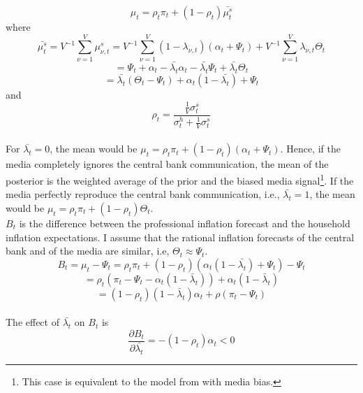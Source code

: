 \documentclass[review]{elsarticle}
\begin{document}
\begin{equation}
\mu_t = \rho_t \pi_t + (1- \rho_t) \bar{\mu_t^s} 
\end{equation}
where
\begin{equation}
\bar{\mu_t^s} = V^{-1} \sum^V_{\nu = 1} \mu_{\nu,t}^s = V^{-1} \sum^V_{\nu =1} (1-\lambda_{\nu,t}) (\alpha_t + \Psi_t) + V^{-1} \sum^V_{\nu =1} \lambda_{\nu,t} \Theta_t  
\end{equation}
\begin{equation}
=\Psi_t + \alpha_t - \bar{\lambda_t} \alpha_t - \bar{\lambda_t} \Psi_t + \bar{\lambda_t}\Theta_t 
\end{equation}
\begin{equation}
=\bar{\lambda_t}(\Theta_t - \Psi_t) + \alpha_t(1- \bar{\lambda_t}) + \Psi_t
\end{equation}
and
\begin{equation}
\rho_t = \frac{\frac{1}{V}\sigma^s_t}{{\sigma^h_t + \frac{1}{V}}\sigma^s_t}
\end{equation}
\\
For $\bar{\lambda_t} = 0$, the mean would be $\mu_t = \rho_t \pi_t + (1- \rho_t) (\alpha_t + \Psi_t)$. Hence, if the media completely ignores the central bank communication, the mean of the posterior is the weighted average of the prior and the biased media signal\footnote{This case is equivalent to the model from \cite{LamlaLein2014} with media bias.}. If the media perfectly reproduce the central bank communication, i.e., $\bar{\lambda_t} = 1$, the mean would be $\mu_t = \rho_t \pi_t + (1-\rho_t) \Theta_t$. 
\\
$B_t$ is the difference between the professional inflation forecast and the household inflation expectations. I assume that the rational inflation forecasts of the central bank and of the media are similar, i.e, $\Theta_t \approx \Psi_t$.
\begin{equation}
B_t = \mu_t - \Psi_t = \rho_t \pi_t + (1-\rho_t)(\alpha_t(1- \bar{\lambda_t}) + \Psi_t) - \Psi_t
\end{equation}
\begin{equation}
= \rho_t (\pi_t - \Psi_t - \alpha_t (1-\bar{\lambda}_t)) + \alpha_t (1- \bar{\lambda}_t)
\end{equation}
\begin{equation}
= (1-\rho_t)(1-\bar{\lambda}_t)\alpha_t + \rho(\pi_t - \Psi_t)
\end{equation}
\\
The effect of $\bar{\lambda_t}$ on $B_t$ is
\begin{equation}
\frac{\partial B_t}{\partial \bar{\lambda_t}} = -(1-\rho_t)\alpha_t < 0
\end{equation}
\end{document}
